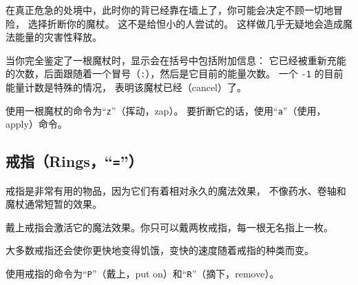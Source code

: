 \documentclass[a4paper, 10pt]{article}
\begin{document}
在真正危急的处境中，此时你的背已经靠在墙上了，你可能会决定不顾一切地冒险，
选择折断你的魔杖。
这不是给怛小的人尝试的。
这样做几乎无疑地会造成魔法能量的灾害性释放。

当你完全鉴定了一根魔杖时，\zhTransInventory{}显示会在括号中包括附加信息：
它已经被重新充能的次数，后面跟随着一个冒号（{\tt :}），然后是它目前的能量次数。
一个 {\tt -1} 的目前能量计数是特殊的情况，
表明该魔杖已经\zhTransCancel（cancel）了。

使用一根魔杖的命令为“{\tt z}”（挥动，zap）。
要折断它的话，使用“{\tt a}”（使用，apply）命令。

\subsection*{戒指（Rings，“{\tt =}”）}

戒指是非常有用的物品，因为它们有着相对永久的魔法效果，
不像药水、卷轴和魔杖通常短暂的效果。

戴上戒指会激活它的魔法效果。你只可以戴两枚戒指，每一根无名指上一枚。

大多数戒指还会使你更快地变得饥饿，变快的速度随着戒指的种类而变。

使用戒指的命令为“{\tt P}”（戴上，put on）和“{\tt R}”（摘下，remove）。
\end{document}

